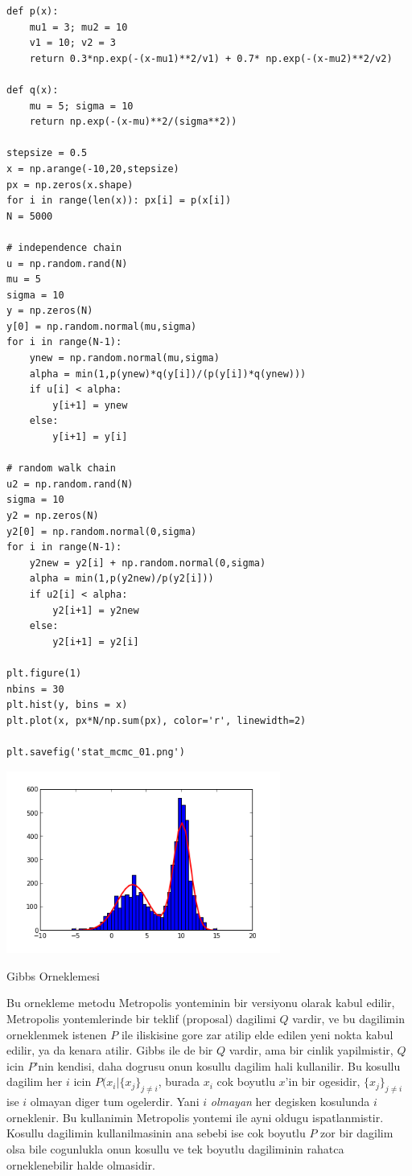 \documentclass[12pt,fleqn]{article}\usepackage{../common}
\begin{document}
\begin{verbatim}
def p(x):
    mu1 = 3; mu2 = 10
    v1 = 10; v2 = 3
    return 0.3*np.exp(-(x-mu1)**2/v1) + 0.7* np.exp(-(x-mu2)**2/v2)

def q(x):
    mu = 5; sigma = 10
    return np.exp(-(x-mu)**2/(sigma**2))

stepsize = 0.5
x = np.arange(-10,20,stepsize)
px = np.zeros(x.shape)
for i in range(len(x)): px[i] = p(x[i])
N = 5000

# independence chain
u = np.random.rand(N)
mu = 5
sigma = 10
y = np.zeros(N)
y[0] = np.random.normal(mu,sigma)
for i in range(N-1):
    ynew = np.random.normal(mu,sigma)
    alpha = min(1,p(ynew)*q(y[i])/(p(y[i])*q(ynew)))
    if u[i] < alpha:
        y[i+1] = ynew
    else:
        y[i+1] = y[i]

# random walk chain
u2 = np.random.rand(N)
sigma = 10
y2 = np.zeros(N)
y2[0] = np.random.normal(0,sigma)
for i in range(N-1):
    y2new = y2[i] + np.random.normal(0,sigma)
    alpha = min(1,p(y2new)/p(y2[i]))
    if u2[i] < alpha:
        y2[i+1] = y2new
    else:
        y2[i+1] = y2[i]

plt.figure(1)
nbins = 30
plt.hist(y, bins = x)
plt.plot(x, px*N/np.sum(px), color='r', linewidth=2)

plt.savefig('stat_mcmc_01.png')
\end{verbatim}

\includegraphics[height=6cm]{stat_mcmc_01.png}

Gibbs Orneklemesi

Bu ornekleme metodu Metropolis yonteminin bir versiyonu olarak kabul
edilir, Metropolis yontemlerinde bir teklif (proposal) dagilimi $Q$ vardir,
ve bu dagilimin orneklenmek istenen $P$ ile iliskisine gore zar atilip elde
edilen yeni nokta kabul edilir, ya da kenara atilir. Gibbs ile de bir $Q$
vardir, ama bir cinlik yapilmistir, $Q$ icin $P$'nin kendisi, daha dogrusu
onun kosullu dagilim hali kullanilir. Bu kosullu dagilim her $i$ icin
$P(x_i|\{x_j\}_{j \ne i}$, burada $x_i$ cok boyutlu $x$'in bir ogesidir,
$\{x_j\}_{j \ne i}$ ise $i$ olmayan diger tum ogelerdir. Yani $i$ {\em
  olmayan} her degisken kosulunda $i$ orneklenir. Bu kullanimin Metropolis
yontemi ile ayni oldugu ispatlanmistir. Kosullu dagilimin kullanilmasinin
ana sebebi ise cok boyutlu $P$ zor bir dagilim olsa bile cogunlukla onun
kosullu ve tek boyutlu dagiliminin rahatca orneklenebilir halde olmasidir.
\end{document}
